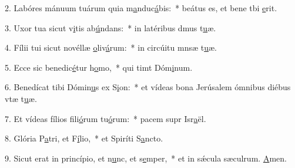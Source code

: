 2. Labóres mánuum tuárum quia m\uline{a}nduc\uline{á}bis:~* beátus es, et bene tbi \uline{e}rit.\par 
3. Uxor tua sicut v\uline{i}tis ab\uline{ú}ndans:~* in latéribus dmus t\uline{u}æ.\par 
4. Fílii tui sicut novéllæ \uline{o}liv\uline{á}rum:~* in circúitu mnsæ t\uline{u}æ.\par 
5. Ecce sic benedic\uline{é}tur h\uline{o}mo,~* qui timt Dóm\uline{i}num.\par 
6. Benedícat tibi Dómin\uline{u}s ex S\uline{i}on:~* et vídeas bona Jerúsalem ómnibus diébus vtæ t\uline{u}æ.\par 
7. Et vídeas fílios fili\uline{ó}rum tu\uline{ó}rum:~* pacem supr Isr\uline{a}ël.\par 
8. Glória P\uline{a}tri, et F\uline{í}lio,~* et Spiríti S\uline{a}ncto.\par 
9. Sicut erat in princípio, et n\uline{u}nc, et s\uline{e}mper,~* et in sǽcula sæculrum. \uline{A}men.\par 
